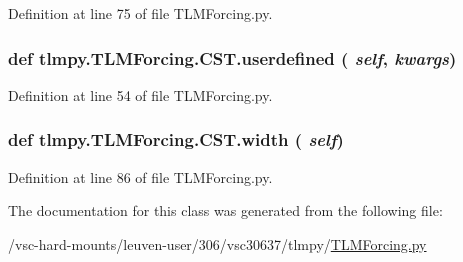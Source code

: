 Definition at line 75 of file TLMForcing.py.\hypertarget{classtlmpy_1_1TLMForcing_1_1CST_a791cbb3a4f49bd4be2dd1f07e7e11369}{
\subsubsection[{userdefined}]{\setlength{\rightskip}{0pt plus 5cm}def tlmpy.TLMForcing.CST.userdefined ( {\em self}, \/   {\em kwargs})}}
\label{classtlmpy_1_1TLMForcing_1_1CST_a791cbb3a4f49bd4be2dd1f07e7e11369}


Definition at line 54 of file TLMForcing.py.\hypertarget{classtlmpy_1_1TLMForcing_1_1CST_acd80b55685e8b37dc3367971b2d65925}{
\subsubsection[{width}]{\setlength{\rightskip}{0pt plus 5cm}def tlmpy.TLMForcing.CST.width ( {\em self})}}
\label{classtlmpy_1_1TLMForcing_1_1CST_acd80b55685e8b37dc3367971b2d65925}


Definition at line 86 of file TLMForcing.py.

The documentation for this class was generated from the following file:\begin{DoxyCompactItemize}
\item 
/vsc-\/hard-\/mounts/leuven-\/user/306/vsc30637/tlmpy/\hyperlink{TLMForcing_8py}{TLMForcing.py}\end{DoxyCompactItemize}
